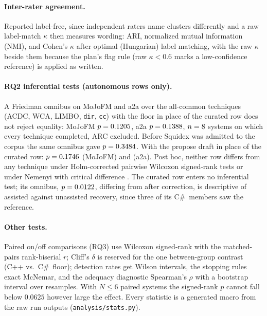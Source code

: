 \documentclass[10pt,conference]{IEEEtran}
\begin{document}
\paragraph{Inter-rater agreement.} Reported label-free, since independent raters name clusters
differently and a raw label-match $\kappa$ then measures wording: ARI, normalized mutual
information (NMI), and Cohen's $\kappa$ after optimal (Hungarian) label matching, with the raw
$\kappa$ beside them because the plan's flag rule (raw $\kappa<0.6$ marks a low-confidence
reference) is applied as written.

\paragraph{RQ2 inferential tests (autonomous rows only).} A Friedman omnibus on MoJoFM and a2a
over the all-common techniques (ACDC, WCA, LIMBO, \texttt{dir}, \texttt{cc}) with the floor in
place of the curated row does not reject equality: MoJoFM $p=0.1205$, a2a
$p=0.1388$, $n=8$ systems on which every technique completed,
ARC excluded. Before Squidex was admitted to the corpus the same omnibus gave
$p=0.3484$. With the propose draft in place of the curated row:
$p=0.1746$ (MoJoFM) and \rqTwoFriedmanProposeAtoAP{} (a2a). Post hoc, neither row
differs from any technique under Holm-corrected pairwise Wilcoxon signed-rank tests or under
Nemenyi with critical difference \rqTwoCriticalDifference{}. The curated row enters no inferential
test; its omnibus, $p=0.0122$, differing from \rqTwoPosthocDiffers{} after correction,
is descriptive of assisted against unassisted recovery, since three of its C\#\ members saw the
reference.

\paragraph{Other tests.} Paired on/off comparisons (RQ3) use Wilcoxon signed-rank with the
matched-pairs rank-biserial $r$; Cliff's $\delta$ is reserved for the one between-group contrast
(C++ vs.\ C\#\ floor); detection rates get Wilson intervals, the stopping rules exact McNemar, and
the adequacy diagnostic Spearman's $\rho$ with a bootstrap interval over
\rqAdequacyRhoBootReps{} resamples. With $N\le 6$ paired systems the signed-rank $p$ cannot fall
below $0.0625$ however large the effect. Every statistic is a generated macro from the raw run
outputs (\texttt{analysis/stats.py}).
\end{document}
